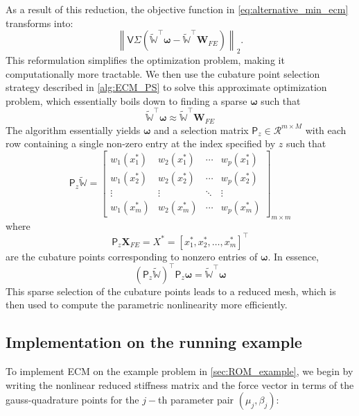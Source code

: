 \documentclass[11pt]{article}
\renewcommand{\vec}[1]{\mathbf{#1}}
\newcommand{\mat}[1]{\mathsf{#1}}
\begin{document}
As a result of this reduction, the objective function in \cref{eq:alternative_min_ecm} transforms into:
\begin{equation}
\left\| \mat{V} \mat{\Sigma} \left( \widetilde{\mathbb{W}}^{\top} \boldsymbol{\omega} - \widetilde{\mathbb{W}}^{\top} \vec{W}_{FE} \right) \right\|_2.
\label{eq:ecm_opt2_a}
\end{equation}
This reformulation simplifies the optimization problem, making it  computationally more tractable. 
We then use the cubature point selection strategy described in \cref{alg:ECM_PS} to solve this approximate optimization problem, which essentially boils down to finding  a sparse $\boldsymbol{\omega}$ such that
\begin{equation}
\widetilde{\mathbb{W}}^{\top} \boldsymbol{\omega} \approx \widetilde{\mathbb{W}}^{\top} \vec{W}_{FE}
\label{eq:ecm_opt3}
\end{equation}
The algorithm essentially yields $\boldsymbol{\omega}$ and a selection matrix $\mat{P}_z\in \mathcal{R}^{m\times M}$ with each row containing a single non-zero entry at the index specified by $z$ such that
\begin{equation}
\mat{P}_z \mathbb{\widetilde{W}} =
\begin{bmatrix}
w_1(x_1^*) & w_2(x_1^*) & \cdots & w_p(x_1^*) \\
w_1(x_2^*) & w_2(x_2^*) & \cdots & w_p(x_2^*) \\
\vdots & \vdots & \ddots & \vdots \\
w_1(x_m^*) & w_2(x_m^*) & \cdots & w_p(x_m^*)
\end{bmatrix}_{m \times m}
\end{equation}
where  
\begin{equation}
\mat{P}_z \vec{X}_{FE} = X^* = [x_1^*, x_2^*, \ldots, x_m^*]^{\top}
\end{equation}
are the cubature points corresponding to nonzero entries of $\boldsymbol\omega$. 
In essence,
\begin{equation}
(\mat{P}_z\widetilde{\mathbb{W}})^{\top} \mat{P}_z\boldsymbol{\omega} = \widetilde{\mathbb{W}}^{\top} \boldsymbol\omega
\end{equation}
This sparse selection of the cubature points leads to a reduced mesh, which is then used to compute the parametric nonlinearity more efficiently.




\subsection*{Implementation on the running example}
To implement ECM on the example problem in \cref{sec:ROM_example}, we begin by writing the nonlinear reduced stiffness matrix and the force vector in terms of the gauss-quadrature points for the $j-$th parameter pair $(\mu_j,\beta_j)$:
\end{document}

